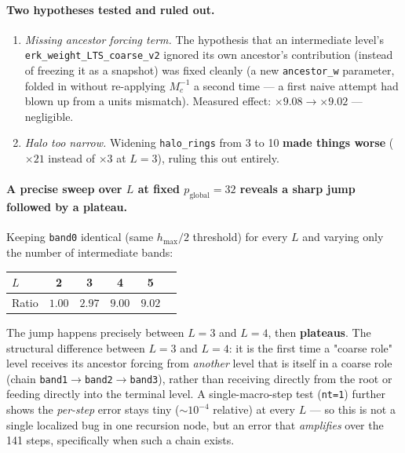 \documentclass[11pt]{article}
\newcommand{\code}[1]{\texttt{#1}}
\begin{document}
\paragraph{Two hypotheses tested and ruled out.}
\begin{enumerate}
  \item \emph{Missing ancestor forcing term.} The hypothesis that an
  intermediate level's \code{erk\_weight\_LTS\_coarse\_v2} ignored its
  own ancestor's contribution (instead of freezing it as a snapshot)
  was fixed cleanly (a new \code{ancestor\_w} parameter, folded in
  without re-applying $M_c^{-1}$ a second time --- a first naive attempt
  had blown up from a units mismatch). Measured effect: $\times 9.08 \to
  \times 9.02$ --- negligible.
  \item \emph{Halo too narrow.} Widening \code{halo\_rings} from 3 to 10
  \textbf{made things worse} ($\times 21$ instead of $\times 3$ at
  $L=3$), ruling this out entirely.
\end{enumerate}

\paragraph{A precise sweep over $L$ at fixed $p_{\text{global}}=32$
reveals a sharp jump followed by a plateau.} Keeping \code{band0}
identical (same $h_{\max}/2$ threshold) for every $L$ and varying only
the number of intermediate bands:
\begin{center}
\begin{tabular}{@{}lccccc@{}}
\toprule
$L$ & 2 & 3 & 4 & 5 \\
\midrule
Ratio & $1.00$ & $2.97$ & $9.00$ & $9.02$ \\
\bottomrule
\end{tabular}
\end{center}
The jump happens precisely between $L=3$ and $L=4$, then
\textbf{plateaus}. The structural difference between $L=3$ and $L=4$:
it is the first time a "coarse role" level receives its ancestor
forcing from \emph{another} level that is itself in a coarse role
(chain \code{band1}$\to$\code{band2}$\to$\code{band3}), rather than
receiving directly from the root or feeding directly into the terminal
level. A single-macro-step test (\code{nt=1}) further shows the
\emph{per-step} error stays tiny ($\sim 10^{-4}$ relative) at every
$L$ --- so this is not a single localized bug in one recursion node,
but an error that \emph{amplifies} over the 141 steps, specifically
when such a chain exists.
\end{document}
